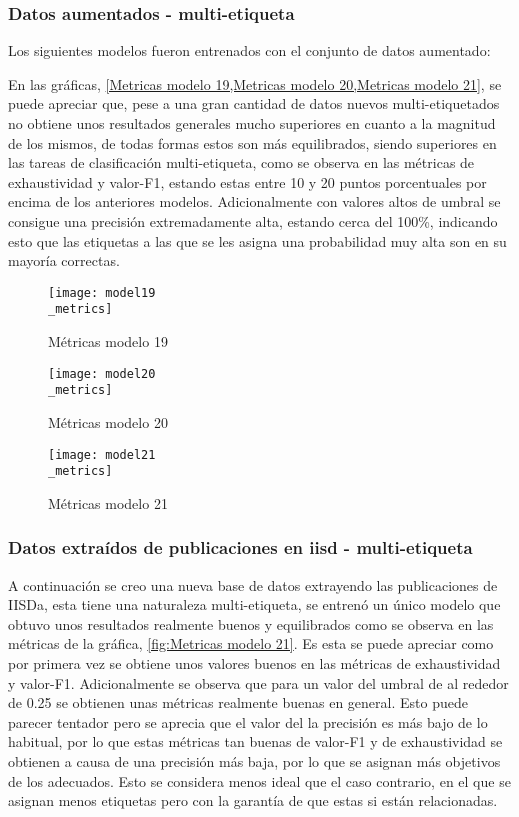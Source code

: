 \subsubsection{Datos aumentados - multi-etiqueta}
Los siguientes modelos fueron entrenados con el conjunto de datos aumentado:

En las gráficas, \cref{Metricas modelo 19,Metricas modelo 20,Metricas modelo 21}, se
puede apreciar que, pese a una gran cantidad de datos nuevos multi-etiquetados
no obtiene unos resultados generales mucho superiores en cuanto a la magnitud de
los mismos, de todas formas estos son más equilibrados, siendo superiores en las
tareas de clasificación multi-etiqueta, como se observa en las métricas de
exhaustividad y valor-F1, estando estas entre 10 y 20 puntos porcentuales por
encima de los anteriores modelos. Adicionalmente con valores altos de umbral se
consigue una precisión extremadamente alta, estando cerca del 100\%, indicando
esto que las etiquetas a las que se les asigna una probabilidad muy alta son
en su mayoría correctas.

\begin{figure}[H]
    \centering
    \texttt{[image: model19\\\_metrics]}
    \captionsetup{justification=centering}
    \caption{Métricas modelo 19}
    \label{Metricas modelo 19}
\end{figure}
\begin{figure}[H]
    \centering
    \texttt{[image: model20\\\_metrics]}
    \captionsetup{justification=centering}
    \caption{Métricas modelo 20}
    \label{Metricas modelo 20}
\end{figure}
\begin{figure}[H]
    \centering
    \texttt{[image: model21\\\_metrics]}
    \captionsetup{justification=centering}
    \caption{Métricas modelo 21}
    \label{Metricas modelo 21}
\end{figure}


\subsubsection{Datos extraídos de publicaciones en \textbf{iisd} -
multi-etiqueta} \label{ch: Datos iisd} A continuación se creo una nueva base de
datos extrayendo las publicaciones de \gls{IISDa}, esta tiene una naturaleza multi-etiqueta, se entrenó un
único modelo que obtuvo unos resultados realmente buenos y equilibrados como se
observa en las métricas de la gráfica, \cref{fig:Metricas modelo 21}. Es esta se
puede apreciar como por primera vez se obtiene unos valores buenos en las
métricas de exhaustividad y valor-F1. Adicionalmente se observa que para un
valor del umbral de al rededor de 0.25 se obtienen unas métricas realmente
buenas en general. Esto puede parecer tentador pero se aprecia que el valor del
la precisión es más bajo de lo habitual, por lo que estas métricas tan buenas de
valor-F1 y de exhaustividad se obtienen a causa de una precisión más baja, por
lo que se asignan más objetivos de los adecuados. Esto se considera menos ideal
que el caso contrario, en el que se asignan menos etiquetas pero con la garantía
de que estas si están relacionadas.

